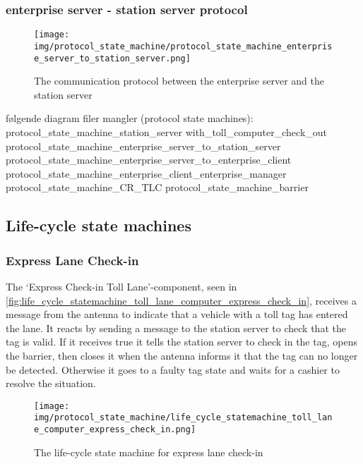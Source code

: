 \subsubsection*{enterprise server - station server protocol}
\begin{figure}
\centering
\texttt{[image: img/protocol\_state\_machine/protocol\_state\_machine\_enterprise\_server\_to\_station\_server.png]}
\caption{The communication protocol between the enterprise server and the station server}
\label{fig:protocol_state_machine_enterprise_server_to_station_server}
\end{figure}


følgende diagram filer mangler (protocol state machines):
protocol_state_machine_station_server with_toll_computer_check_out
protocol_state_machine_enterprise_server_to_station_server
protocol_state_machine_enterprise_server_to_enterprise_client
protocol_state_machine_enterprise_client_enterprise_manager
protocol_state_machine_CR_TLC
protocol_state_machine_barrier


\subsection*{Life-cycle state machines}
\subsubsection*{Express Lane Check-in}
The ‘Express Check-in Toll Lane’-component, seen in \autoref{fig:life_cycle_statemachine_toll_lane_computer_express_check_in}, receives a message from the antenna to indicate that a vehicle with a toll tag has entered the lane. It reacts by sending a message to the station server to check that the tag is valid. If it receives true it tells the station server to check in the tag, opens the barrier, then closes it when the antenna informs it that the tag can no longer be detected.  Otherwise it goes to a faulty tag state and waits for a cashier to resolve the situation. 
\begin{figure}
\centering
\texttt{[image: img/protocol\_state\_machine/life\_cycle\_statemachine\_toll\_lane\_computer\_express\_check\_in.png]}
\caption{The life-cycle state machine for express lane check-in}
\label{fig:life_cycle_statemachine_toll_lane_computer_express_check_in}
\end{figure}

